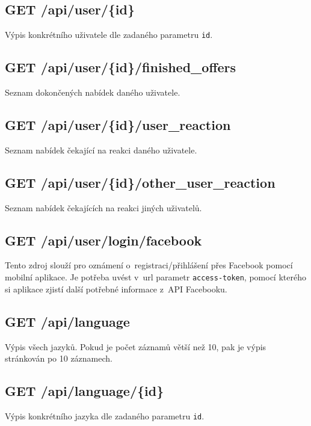 \subsection{GET /api/user/\{id\}}
Výpis konkrétního uživatele dle zadaného parametru \texttt{id}.

\subsection{GET /api/user/\{id\}/finished\_offers}
Seznam dokončených nabídek daného uživatele.

\subsection{GET /api/user/\{id\}/user\_reaction}
Seznam nabídek čekající na reakci daného uživatele.

\subsection{GET /api/user/\{id\}/other\_user\_reaction}
Seznam nabídek čekajících na reakci jiných uživatelů.

\subsection{GET /api/user/login/facebook}
Tento zdroj slouží pro oznámení o~registraci/přihlášení přes Facebook pomocí mobilní aplikace. Je potřeba uvést v~url parametr \texttt{access-token}, pomocí kterého si aplikace zjistí další potřebné informace z~API Facebooku.

\subsection{GET /api/language}
Výpis všech jazyků. Pokud je počet záznamů větší než 10, pak je výpis stránkován po 10 záznamech.

\subsection{GET /api/language/\{id\}}
Výpis konkrétního jazyka dle zadaného parametru \texttt{id}.
